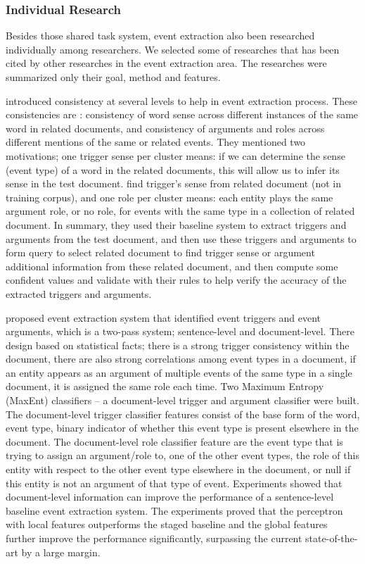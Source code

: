\subsubsection{Individual Research}
\label{eventresearch}
	Besides those shared task system, event extraction also been researched individually among researchers. We selected some of researches that has been cited by other researches in the event extraction area. The researches were summarized only their goal, method and features.

\cite{ji2008refining} introduced consistency at several levels to help in event extraction process. These consistencies are : consistency of word sense across different instances of the same word in related documents, and consistency of arguments and roles across different mentions of the same or related events. They mentioned two motivations; one trigger sense per cluster means: if we can determine the sense (event type) of a word in the related documents, this will allow us to infer its sense in the test document. find trigger’s sense from related document (not in training corpus), and one role per cluster means: each entity plays the same argument role, or no role, for events with the same type in a collection of related document. In summary, they used their baseline system to extract triggers and arguments from the test document, and then use these triggers and arguments to form query to select related document to find trigger sense or argument additional information from these related document, and then compute some confident values and validate with their rules to help verify the accuracy of the extracted triggers and arguments.

\cite{liao2010using} proposed event extraction system that identified event triggers and event arguments, which is a two-pass system; sentence-level and document-level. There design based on statistical facts; there is a strong trigger consistency within the document, there are also strong correlations among event types in a document, if an entity appears as an argument of multiple events of the same type in a single document, it is assigned the same role each time. Two Maximum Entropy (MaxEnt) classifiers – a document-level trigger and argument classifier were built. The document-level trigger classifier features consist of the base form of the word, event type, binary indicator of whether this event type is present elsewhere in the document. The document-level role classifier feature are the event type that is trying to assign an argument/role to, one of the other event types, the role of this entity with respect to the other event type elsewhere in the document, or null if this entity is not an argument of that type of event. Experiments showed that document-level information can improve the performance of a sentence-level baseline event extraction system. The experiments proved that the perceptron with local features outperforms the staged baseline and the global features further improve the performance signiﬁcantly, surpassing the current state-of-the-art by a large margin. 

